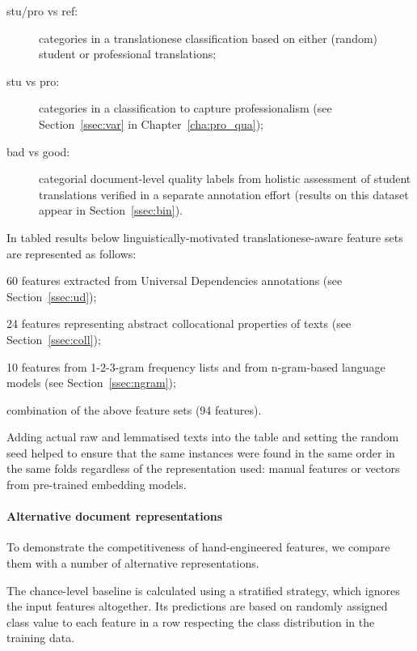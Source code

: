 \begin{description}\compresslist{}
	\item[stu/pro vs ref:] categories in a translationese classification based on either (random) student or professional translations;
	\item[stu vs pro:] categories in a classification to capture professionalism (see Section~\ref{ssec:var} in Chapter~\ref{cha:pro_qua});
	\item[bad vs good:] categorial document-level quality labels from holistic assessment of student translations verified in a separate annotation effort (results on this dataset appear in Section~\ref{ssec:bin}).
\end{description}

In tabled results below linguistically-motivated translationese-aware feature sets are represented as follows:
\begin{description}\compresslist{}
	\item[UD:] 60 features extracted from Universal Dependencies annotations (see Section~\ref{ssec:ud});
	\item[collgram:] 24 features representing abstract collocational properties of texts (see Section~\ref{ssec:coll});
	\item[ngram:] 10 features from 1-2-3-gram frequency lists and from n-gram-based language models (see Section~\ref{ssec:ngram});
	\item[all:] combination of the above feature sets (94 features).
\end{description}  

Adding actual raw and lemmatised texts into the table and setting the random seed helped to ensure that the same instances were found in the same order in the same folds regardless of the representation used: manual features or vectors from pre-trained embedding models.

\paragraph{\label{pg:vectors}Alternative document representations} To demonstrate the competitiveness of hand-engineered features, we compare them with a number of alternative representations. 

The chance-level baseline is calculated using a stratified strategy, which ignores the input features altogether. Its predictions are based on randomly assigned class value to each feature in a row respecting the class distribution in the training data.

